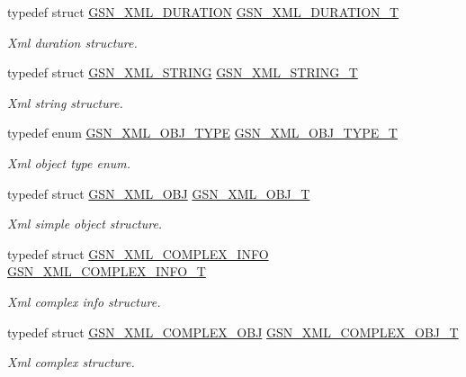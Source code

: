 \begin{DoxyCompactItemize}
typedef struct \hyperlink{a00433}{GSN\_\-XML\_\-DURATION} \hyperlink{a00679_ga86881eeaa017b4544baa061c52d6cd63}{GSN\_\-XML\_\-DURATION\_\-T}
\begin{DoxyCompactList}\small\item\em Xml duration structure. \end{DoxyCompactList}\item 
typedef struct \hyperlink{a00436}{GSN\_\-XML\_\-STRING} \hyperlink{a00679_ga463f36b04e13c9f42e702c5a53312da8}{GSN\_\-XML\_\-STRING\_\-T}
\begin{DoxyCompactList}\small\item\em Xml string structure. \end{DoxyCompactList}\item 
typedef enum \hyperlink{a00679_gad31ca0a5bf81e8fbb6c9a048ef2c02c8}{GSN\_\-XML\_\-OBJ\_\-TYPE} \hyperlink{a00679_gaa26694299ab465dbf5806f74d06aedc9}{GSN\_\-XML\_\-OBJ\_\-TYPE\_\-T}
\begin{DoxyCompactList}\small\item\em Xml object type enum. \end{DoxyCompactList}\item 
typedef struct \hyperlink{a00435}{GSN\_\-XML\_\-OBJ} \hyperlink{a00679_ga158eab6806ea5fb00bc315226103c20a}{GSN\_\-XML\_\-OBJ\_\-T}
\begin{DoxyCompactList}\small\item\em Xml simple object structure. \end{DoxyCompactList}\item 
typedef struct \hyperlink{a00429}{GSN\_\-XML\_\-COMPLEX\_\-INFO} \hyperlink{a00679_gaa0d09c1190da464d384f10b95b4860eb}{GSN\_\-XML\_\-COMPLEX\_\-INFO\_\-T}
\begin{DoxyCompactList}\small\item\em Xml complex info structure. \end{DoxyCompactList}\item 
typedef struct \hyperlink{a00430}{GSN\_\-XML\_\-COMPLEX\_\-OBJ} \hyperlink{a00679_gacbfb0f478c8c0a699ae348b9ed1e5133}{GSN\_\-XML\_\-COMPLEX\_\-OBJ\_\-T}
\begin{DoxyCompactList}\small\item\em Xml complex structure. \end{DoxyCompactList}\end{DoxyCompactItemize}
